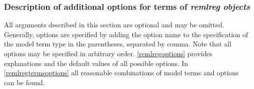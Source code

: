 





\subsubsection{Description of additional options for terms of {\em remlreg objects}}
\label{remlreglocaloptions}

All arguments described in this section are optional and may be
omitted. Generally, options are specified by adding the option
name to the specification of the model term type in the
parentheses, separated by comma. Note that all options may be
specified in arbitrary order. \autoref{remlregoptions} provides
explanations and the default values of all possible options. In
\autoref{remlregtermsoptions} all reasonable combinations of model
terms and options can be found.

